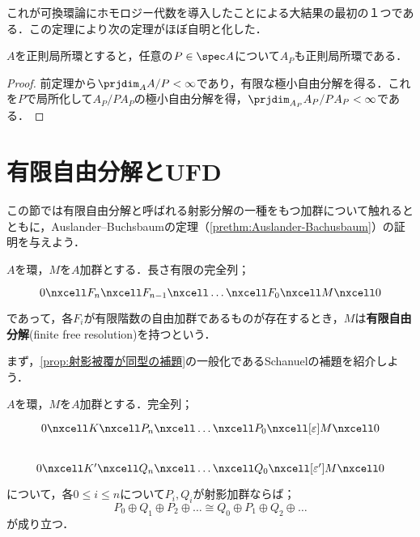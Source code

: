 これが可換環論にホモロジー代数を導入したことによる大結果の最初の１つである．この定理により次の定理がほぼ自明と化した．
\begin{thm}[Serreの定理]\label{thm:Serreの定理}
	$A$を正則局所環とすると，任意の$P\in\spec A$について$A_P$も正則局所環である．
\end{thm}

\begin{proof}
	前定理から$\prjdim_A A/P<\infty$であり，有限な極小自由分解を得る．これを$P$で局所化して$A_P/PA_P$の極小自由分解を得，$\prjdim_{A_P} A_P/PA_P<\infty$である．
\end{proof}

\section{有限自由分解とUFD}

この節では有限自由分解と呼ばれる射影分解の一種をもつ加群について触れるとともに，Auslander--Buchsbaumの定理（\ref{prethm:Auslander-Bachusbaum}）の証明を与えよう．
\begin{defi}[有限自由分解]
	$A$を環，$M$を$A$加群とする．長さ有限の完全列；
	\[\begin{tikzcd}
		0\nxcell F_n\nxcell F_{n-1}\nxcell\dots\nxcell F_0\nxcell M\nxcell 0
	\end{tikzcd}\]
	であって，各$F_i$が有限階数の自由加群であるものが存在するとき，$M$は\textbf{有限自由分解}(finite free resolution)を持つという．
\end{defi}

まず，\ref{prop:射影被覆が同型の補題}の一般化であるSchanuelの補題を紹介しよう．
\begin{lem}[Schanuelの補題]
	$A$を環，$M$を$A$加群とする．完全列；
	\[\begin{tikzcd}
		0\nxcell K\nxcell P_n\nxcell\dots\nxcell P_0\nxcell[\varepsilon] M\nxcell0\\
		0\nxcell K'\nxcell Q_n\nxcell\dots\nxcell Q_0\nxcell[\varepsilon'] M\nxcell0
	\end{tikzcd}\]
	について，各$0\leq i\leq n$について$P_i,Q_i$が射影加群ならば；
	\[P_0\oplus Q_1\oplus P_2\oplus\dots\cong Q_0\oplus P_1\oplus Q_2\oplus\dots\]
	が成り立つ．
\end{lem}

